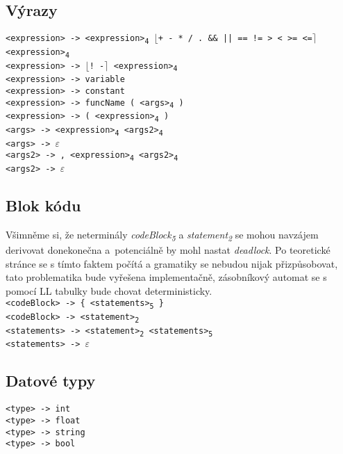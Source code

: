 \documentclass[a4paper]{article}
\begin{document}
\subsection*{Výrazy}
\texttt{<expression> -> <expression>\textsubscript{4} $\lfloor$+ - * / . \&\& || == != > < >= <=$\rceil$ <expression>\textsubscript{4}}\\
\texttt{<expression> -> $\lfloor$! -$\rceil$ <expression>\textsubscript{4}}\\
\texttt{<expression> -> variable}\\
\texttt{<expression> -> constant}\\
\texttt{<expression> -> funcName ( <args>\textsubscript{4} )}\\
\texttt{<expression> -> ( <expression>\textsubscript{4} )}\\[1em]
\texttt{<args> -> <expression>\textsubscript{4} <args2>\textsubscript{4}}\\
\texttt{<args> -> $\varepsilon$}\\[1em]
\texttt{<args2> -> , <expression>\textsubscript{4} <args2>\textsubscript{4}}\\
\texttt{<args2> -> $\varepsilon$}

\subsection*{Blok kódu}
Všimněme si, že neterminály \emph{codeBlock\textsubscript{5}} a \emph{statement\textsubscript{2}} se mohou navzájem derivovat donekonečna a~po\-ten\-ci\-ál\-ně by mohl nastat \emph{deadlock}.
Po teoretické stránce se s tímto faktem počítá a gramatiky se nebudou nijak přiz\-pů\-so\-bo\-vat, tato problematika bude vyřešena implementačně, zásobníkový automat se s pomocí LL ta\-bul\-ky bude chovat deterministicky. \\[1em]
\texttt{<codeBlock> -> \{ <statements>\textsubscript{5} \}}\\
\texttt{<codeBlock> -> <statement>\textsubscript{2}}\\[1em]
\texttt{<statements> -> <statement>\textsubscript{2} <statements>\textsubscript{5}}\\
\texttt{<statements> -> $\varepsilon$}

\subsection*{Datové typy}
\texttt{<type> -> int}\\
\texttt{<type> -> float}\\
\texttt{<type> -> string}\\
\texttt{<type> -> bool}
\end{document}
